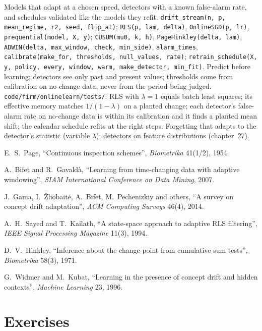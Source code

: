 \begin{build}
 Models that adapt at a chosen speed, detectors with a known false-alarm rate, and schedules validated like
the models they refit.
 \texttt{drift\_stream(n, p, mean\_regime, r2, seed, flip\_at)}; \texttt{RLS(p, lam, delta)},
\texttt{OnlineSGD(p, lr)}, \texttt{prequential(model, X, y)}; \texttt{CUSUM(mu0, k, h)}, \texttt{PageHinkley(delta, lam)},
\texttt{ADWIN(delta, max\_window, check, min\_side)}, \texttt{alarm\_times}, \texttt{calibrate(make\_for, thresholds,
null\_values, rate)}; \texttt{retrain\_schedule(X, y, policy, every, window, warm, make\_detector, min\_fit)}.
 Predict before learning; detectors see only past and present values; thresholds come from calibration on
no-change data, never from the period being judged.
 \texttt{code/firm/onlinelearn/tests/}: RLS with $\lambda = 1$ equals batch least squares; its effective
memory matches $1/(1-\lambda)$ on a planted change; each detector's false-alarm rate on no-change data is within its
calibration and it finds a planted mean shift; the calendar schedule refits at the right steps.
 Forgetting that adapts to the detector's statistic (variable $\lambda$); detectors on feature
distributions (chapter~27).
\end{build}

\begin{omsources}
\item E.~S.~Page, ``Continuous inspection schemes'', \emph{Biometrika} 41(1/2), 1954.
\item A.~Bifet and R.~Gavaldà, ``Learning from time-changing data with adaptive windowing'', \emph{SIAM International
Conference on Data Mining}, 2007.
\item J.~Gama, I.~Žliobaitė, A.~Bifet, M.~Pechenizkiy and others, ``A survey on concept drift adaptation'', \emph{ACM
Computing Surveys} 46(4), 2014.
\item A.~H.~Sayed and T.~Kailath, ``A state-space approach to adaptive RLS filtering'', \emph{IEEE Signal Processing
Magazine} 11(3), 1994.
\item D.~V.~Hinkley, ``Inference about the change-point from cumulative sum tests'', \emph{Biometrika} 58(3), 1971.
\item G.~Widmer and M.~Kubat, ``Learning in the presence of concept drift and hidden contexts'', \emph{Machine Learning} 23,
1996.
\end{omsources}

\section{Exercises}

